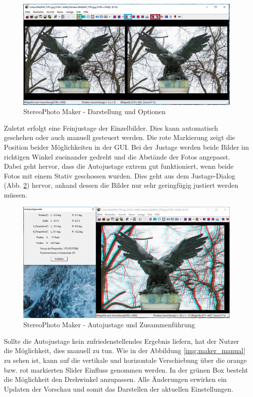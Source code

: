 \documentclass[liststotoc,bibtotoc,fontsize=14pt,]{scrreprt}
\begin{document}
		\begin{figure}[H]
			\includegraphics[width=\linewidth]{img/steps/step2.png}
			\caption{StereoPhoto Maker - Darstellung und Optionen}
			\label{img:maker_options}
		\end{figure}

		Zuletzt erfolgt eine Feinjustage der Einzelbilder. Dies kann automatisch geschehen oder auch manuell gesteuert werden. Die rote Markierung zeigt die Position beider Möglichkeiten in der GUI. Bei der Justage werden beide Bilder im richtigen Winkel zueinander gedreht und die Abstände der Fotos angepasst. Dabei geht hervor, dass die Autojustage extrem gut funktioniert, wenn beide Fotos mit einem Stativ geschossen wurden. Dies geht aus dem Justage-Dialog (Abb. \ref{img:maker_justage}) hervor, anhand dessen die Bilder nur sehr geringfügig justiert werden müssen.
		
		\begin{figure}[H]
			\includegraphics[width=\linewidth]{img/steps/step3.png}
			\caption{StereoPhoto Maker - Autojustage und Zusammenführung}
			\label{img:maker_justage}
		\end{figure}
		
		Sollte die Autojustage kein zufriedenstellendes Ergebnis liefern, hat der Nutzer die Möglichkeit, dies manuell zu tun. Wie in der Abbildung \ref{img:maker_manual} zu sehen ist, kann auf die vertikale und horizontale Verschiebung über die orange bzw. rot markierten Slider Einfluss genommen werden. In der grünen Box besteht die Möglichkeit den Drehwinkel anzupassen. Alle Änderungen erwirken ein Updaten der Vorschau und somit das Darstellen der aktuellen Einstellungen.
		
\end{document}
